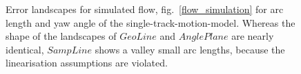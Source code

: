 \documentclass[a4paper]{article}
\begin{document}
\begin{figure}[htb]
\centering

\hfil
{}
\hfil
{}

\caption{Error landscapes for simulated flow, fig.~\ref{flow_simulation} for arc length and yaw angle of the single-track-motion-model. Whereas the shape of the landscapes of $GeoLine$ and $AnglePlane$ are nearly identical, $SampLine$ shows a valley small arc lengths, because the linearisation assumptions are violated.}
\label{fig:error_landscapes}
\end{figure}
\end{document}
